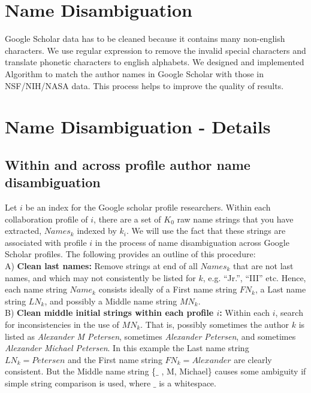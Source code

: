 \section{Name Disambiguation}
Google Scholar data has to be cleaned because it contains many non-english characters. We use regular expression to remove the invalid special characters and translate phonetic characters to english alphabets. We designed and implemented Algorithm to match the author names in Google Scholar with those in NSF/NIH/NASA data. This process helps to improve the quality of results. 




\section{Name Disambiguation - Details}
\subsection{Within and across profile author name disambiguation}

Let $i$ be an index for the Google scholar profile researchers. Within each collaboration profile of $i$,  there are a set of $K_{0}$ raw name strings that you have extracted,  $Names_{k}$ indexed by $k_{i}$. We will use the fact that these strings are associated with profile $i$ in the process of name disambiguation across Google Scholar profiles. The following provides an outline of this procedure: \\


A) {\bf Clean last names:} 
Remove strings at end of all $Names_{k}$ that are not last names, and which may not consistently be listed for $k$, e.g. ``Jr.'', ``III'' etc. Hence, each name string  $Name_{k}$ consists ideally of a First name string $FN_{k}$, a Last name string $LN_{k}$, and possibly a Middle name string $MN_{k}$. \\

B)  {\bf Clean middle initial strings within each profile $i$:}  Within each $i$, search for inconsistencies in the use of $MN_{k}$. That is, possibly sometimes the author $k$ is listed as {\it Alexander M Petersen}, sometimes {\it Alexander Petersen}, and sometimes {\it Alexander Michael Petersen}. In this example the Last name string $LN_{k} = Petersen$ and the First name string $FN_{k} = Alexander$ are clearly consistent. But the Middle name string \{$\_$ , M, Michael\} causes some ambiguity if simple string comparison is used,  where $\_$ is a whitespace. 

